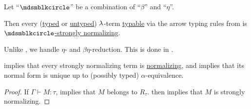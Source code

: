 \begin{theorem}\label{thm:simply_typable_terms_are_strongly_normalizing}
  Let \enquote{\( {\Anon} \)} be a combination of \enquote{\( \beta \)} and \enquote{\( \eta \)}.

  Then every (\hyperref[def:typed_lambda_term]{typed} or \hyperref[def:lambda_term]{untyped}) \( \mathrm{\lambda} \)-term \hyperref[def:typability]{typable} via the arrow typing rules from  is \hyperref[def:strongly_normalizing_lambda_term]{\( \Anon \)-strongly normalizing}.
\end{theorem}
\begin{comments}
  \item Unlike , we handle \( \eta \)- and \( \beta\eta \)-reduction. This is done in .

  \item {} implies that every strongly normalizing term is \hyperref[def:lambda_term_normal_form]{normalizing}, and  implies that its normal form is unique up to (possibly typed) \( \alpha \)-equivalence.
\end{comments}
\begin{proof}
  If \( \Gamma \vdash M: \tau \),  implies that \( M \) belongs to \( R_\tau \).  then implies that \( M \) is strongly normalizing.
\end{proof}
